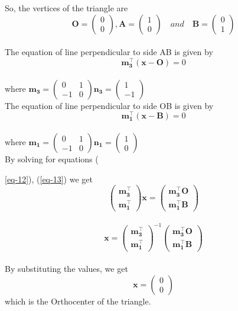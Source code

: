 \documentclass[journal,12pt,twocolumn]{IEEEtran}
\newcommand{\myvec}[1]{\ensuremath{\begin{pmatrix}#1\end{pmatrix}}}
\let\vec\mathbf
\begin{document}
{{{So, the vertices of the triangle are \begin{equation*}
\vec{O} = \myvec{ 0 \\ 0}, \vec{A} = \myvec{ 1 \\ 0} \quad and \quad \vec{B} = \myvec{0 \\ 1}
\end{equation*}
	\\

The equation of line perpendicular to side AB is given by
\begin{equation}
	\vec{m_3^{\top}}(\vec{x}-\vec{O}) = 0   \label{eq-12}
\end{equation}
\\
where 
 $\vec{m_3} = \begin{pmatrix}
0 & 1 \\
-1 & 0 
\end{pmatrix}  \vec{n_3} = \myvec{ 1\\-1}$
\\

The equation of line perpendicular to side OB is given by
\begin{equation}
	\vec{m_1^{\top}}(\vec{x}-\vec{B}) = 0   \label{eq-13}
\end{equation}
\\
where 
 $\vec{m_1} = \begin{pmatrix}
0 & 1 \\
-1 & 0 
\end{pmatrix}  \vec{n_1} = \myvec{ 1\\0}$
\\

By solving for equations ({\ref{eq-12}), (\ref{eq-13}) we get
\begin{equation}
\begin{pmatrix}
\vec{m_3^{\top}} \\
\vec{m_1^{\top}} 
\end{pmatrix} \vec{x} = 
\begin{pmatrix}
\vec{m_3^{\top} O} \\
\vec{m_1^{\top} B}
\label{eq-14}
\end{pmatrix}
\end{equation}
\\
\begin{equation}
\vec{x} = \begin{pmatrix}
\vec{m_3^{\top}} \\
\vec{m_1^{\top}} 
\end{pmatrix}^{-1}  	
\begin{pmatrix}
\vec{m_3^{\top} O} \\
\vec{m_1^{\top} B}
\label{eq-14}
\end{pmatrix}
\end{equation}
\\
By substituting the values, we get
\begin{equation}
\vec{x} = \myvec{ 0\\0}  \label{eq-16}
\end{equation}
which is the Orthocenter of the triangle.

}}}}
\end{document}

